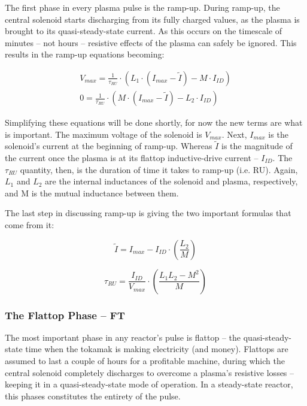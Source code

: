 The first phase in every plasma pulse is the ramp-up. During ramp-up, the central solenoid starts discharging from its fully charged values, as the plasma is brought to its quasi-steady-state current. As this occurs on the timescale of minutes -- not hours -- resistive effects of the plasma can safely be ignored. This results in the ramp-up equations becoming:

\begin{align}
	V_{max} = \frac{1}{\tau_{RU}} \cdot \left( L_1 \cdot ( I_{max} - \tilde I ) - M \cdot I_{ID} \right) \\
	0 = \frac{1}{\tau_{RU}} \cdot \left( M \cdot ( I_{max} - \tilde I ) - L_2 \cdot I_{ID} \right)
\end{align}

Simplifying these equations will be done shortly, for now the new terms are what is important. The maximum voltage of the solenoid is $V_{max}$. Next, $I_{max}$ is the solenoid's current at the beginning of ramp-up. Whereas $\tilde I$ is the magnitude of the current once the plasma is at its flattop inductive-drive current -- $I_{ID}$. The $\tau_{RU}$ quantity, then, is the duration of time it takes to ramp-up (i.e. RU). Again, $L_1$ and $L_2$ are the internal inductances of the solenoid and plasma, respectively, and M is the mutual inductance between them.

The last step in discussing ramp-up is giving the two important formulas that come from it:

\begin{equation}
	\label{eq:itilde}
	\tilde I = I_{max} - I_{ID} \cdot \left( \frac{L_2}{M} \right)
\end{equation}

\begin{equation}
	\label{eq:tauru}
	\tau_{RU} = \frac{I_{ID}}{V_{max}} \cdot \left( \frac{ L_1 L_2 - M^2 }{ M } \right)
\end{equation}

\subsubsection{The Flattop Phase -- FT}

The most important phase in any reactor's pulse is flattop -- the quasi-steady-state time when the tokamak is making electricity (and money). Flattops are assumed to last a couple of hours for a profitable machine, during which the central solenoid completely discharges to overcome a plasma's resistive losses -- keeping it in a quasi-steady-state mode of operation. In a steady-state reactor, this phases constitutes the entirety of the pulse.


